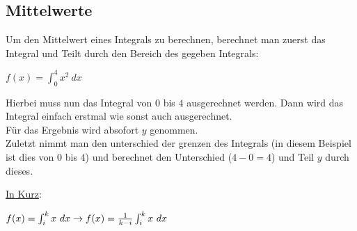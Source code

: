 \subsection{Mittelwerte}
Um den Mittelwert eines Integrals zu berechnen, 
berechnet man zuerst das Integral und Teilt durch den Bereich des gegeben Integrals: 

$
f(x) = \int_0^4 x^2\ dx 
$

Hierbei muss nun das Integral von $0$ bis $4$ ausgerechnet werden. 
Dann wird das Integral einfach erstmal wie sonst auch ausgerechnet. \\
Für das Ergebnis wird absofort $y$ genommen. \\
Zuletzt nimmt man den unterschied der grenzen des Integrals 
(in diesem Beispiel ist dies von $0$ bis $4$) und berechnet den Unterschied ($4 - 0 = 4$) und Teil $y$ durch dieses. 

\underline{In Kurz}: 

$
f(x) = \int_i^k x\ dx \\
\rightarrow f(x) = \frac{1}{k-i} \int_i^k x\ dx
$
